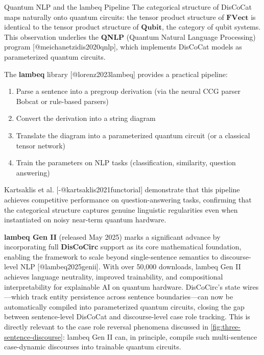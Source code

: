 \documentclass[
  ignorenonframetext,
]{beamer}
\providecommand{\tightlist}{%
  \setlength{\itemsep}{0pt}\setlength{\parskip}{0pt}}
\begin{document}
\begin{frame}{Quantum NLP and the lambeq Pipeline}
\protect{}\label{quantum-nlp-and-the-lambeq-pipeline}
The categorical structure of DisCoCat maps naturally onto quantum
circuits: the tensor product structure of \(\mathbf{FVect}\) is
identical to the tensor product structure of \(\mathbf{Qubit}\), the
category of qubit systems. This observation underlies the \textbf{QNLP}
(Quantum Natural Language Processing) program
{[}@meichanetzidis2020qnlp{]}, which implements DisCoCat models as
parameterized quantum circuits.

The \textbf{lambeq} library {[}@lorenz2023lambeq{]} provides a practical
pipeline:

\begin{enumerate}
\tightlist
\item
  Parse a sentence into a pregroup derivation (via the neural CCG parser
  Bobcat or rule-based parsers)
\item
  Convert the derivation into a string diagram
\item
  Translate the diagram into a parameterized quantum circuit (or a
  classical tensor network)
\item
  Train the parameters on NLP tasks (classification, similarity,
  question answering)
\end{enumerate}

Kartsaklis et al. {[}-@kartsaklis2021functorial{]} demonstrate that this
pipeline achieves competitive performance on question-answering tasks,
confirming that the categorical structure captures genuine linguistic
regularities even when instantiated on noisy near-term quantum hardware.

\textbf{lambeq Gen II} (released May 2025) marks a significant advance
by incorporating full \textbf{DisCoCirc} support as its core
mathematical foundation, enabling the framework to scale beyond
single-sentence semantics to discourse-level NLP {[}@lambeq2025genii{]}.
With over 50,000 downloads, lambeq Gen II achieves language neutrality,
improved trainability, and compositional interpretability for
explainable AI on quantum hardware. DisCoCirc's state wires---which
track entity persistence across sentence boundaries---can now be
automatically compiled into parameterized quantum circuits, closing the
gap between sentence-level DisCoCat and discourse-level case role
tracking. This is directly relevant to the case role reversal phenomena
discussed in \autoref{fig:three-sentence-discourse}: lambeq Gen II can,
in principle, compile such multi-sentence case-dynamic discourses into
trainable quantum circuits.


\end{frame}
\end{document}
